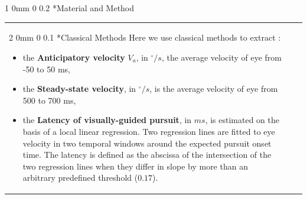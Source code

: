 \documentclass[profile,final,english, draft]{sciposter}%
\makeatletter
\renewcommand{\section}{\@startsection
        {section}%
        {1}%
        {0mm}%
        {0\baselineskip}%
        {0.2\baselineskip}%
        {\LARGE\color{red}\bfseries}}%
\renewcommand{\subsection}{\@startsection
        {subsection}%
        {2}%
        {0mm}%
        {0\baselineskip}%
        {0.1\baselineskip}%
        {\Large\color[rgb]{0.4,0,0}\bfseries}}%
\newcommand{\spacefig}{1.\baselineskip}
\makeatother
\begin{document}
\vspace{.2\baselineskip}

\section*{Material and Method}
\vspace{-.8\baselineskip}

\begin{tabular}{p{}m{}p{}}
\subsection*{Classical Methods}
Here we use classical methods to extract :
\begin{itemize}\setlength{\itemsep}{0ex}
\item the \textbf{Anticipatory velocity} $V_a$, in $^\circ/s$, the average velocity of eye from -50 to 50 ms,
\item the \textbf{Steady-state velocity}, in $^\circ/s$, is the average velocity of eye from 500 to 700 ms,
\item the \textbf{Latency of visually-guided pursuit}, in $ms$,  is estimated on the basis of a local linear regression. Two regression lines are fitted to eye velocity in two temporal windows around the expected pursuit onset time. The latency is defined as the abscissa of the intersection of the two regression lines when they differ in slope by more than an arbitrary predefined threshold ($0.17$).
\end{itemize}


&&

\end{tabular}
\end{document}
